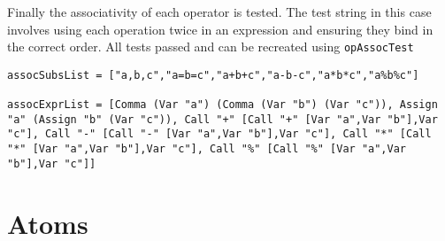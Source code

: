 \documentclass{article}
\begin{document}
Finally the associativity of each operator is tested. The test string in this case involves using each operation twice in an expression and ensuring they bind in the correct order. All tests passed and can be recreated using \texttt{opAssocTest}
\begin{verbatim}
assocSubsList = ["a,b,c","a=b=c","a+b+c","a-b-c","a*b*c","a%b%c"]

assocExprList = [Comma (Var "a") (Comma (Var "b") (Var "c")), Assign "a" (Assign "b" (Var "c")), Call "+" [Call "+" [Var "a",Var "b"],Var "c"], Call "-" [Call "-" [Var "a",Var "b"],Var "c"], Call "*" [Call "*" [Var "a",Var "b"],Var "c"], Call "%" [Call "%" [Var "a",Var "b"],Var "c"]]

\end{verbatim}
\section{Atoms}
\end{document}

